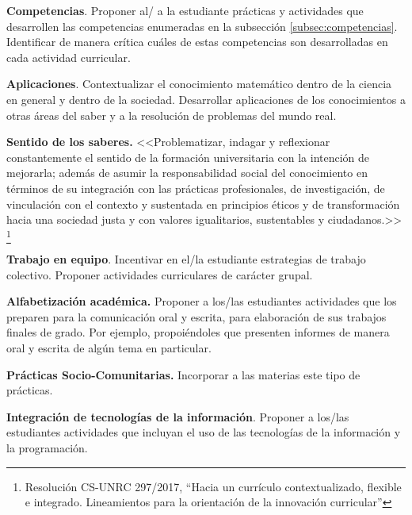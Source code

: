 \documentclass[a4paper, 12pt]{article}
\begin{document}
\begin{description}
  



\item{\textbf{Competencias}.} Proponer al/ a la estudiante prácticas y actividades que desarrollen las competencias enumeradas en la subsección \ref{subsec:competencias}. Identificar de manera crítica cuáles de estas competencias son desarrolladas en cada actividad curricular.


\item{\textbf{Aplicaciones}.}  Contextualizar el conocimiento matemático dentro de la ciencia en general y dentro de la sociedad. Desarrollar aplicaciones de los conocimientos a otras áreas del saber y a la resolución de problemas del mundo real. 




\item{ \textbf{Sentido de los saberes.}} <<Problematizar, indagar y reflexionar constantemente el sentido de la formación
universitaria con la intención de mejorarla; además de asumir la responsabilidad social del
conocimiento en términos de su integración con las prácticas profesionales, de investigación, de
vinculación con el contexto y sustentada en principios éticos y de transformación hacia una
sociedad justa y con valores igualitarios, sustentables y ciudadanos.>> \footnote{Resolución CS-UNRC 297/2017, ``Hacia   un   currículo contextualizado, flexible e integrado. Lineamientos para la orientación de la innovación  curricular''}

\item{\textbf{Trabajo en equipo}.} Incentivar en el/la estudiante estrategias de trabajo colectivo. Proponer actividades curriculares   de carácter  grupal.



\item{ \textbf{Alfabetización académica.}} Proponer a los/las estudiantes actividades que los preparen para la comunicación oral y escrita, para 
elaboración de sus trabajos finales de grado. Por ejemplo, propoiéndoles que presenten informes de manera oral y escrita de algún tema en particular.  




\item{\textbf{Prácticas Socio-Comunitarias.} } Incorporar a las materias este tipo de prácticas.


\item{ \textbf{Integración de tecnologías de la información}.} Proponer a los/las estudiantes actividades que incluyan el uso de las tecnologías de la información y la programación.  




\end{description}
\end{document}
